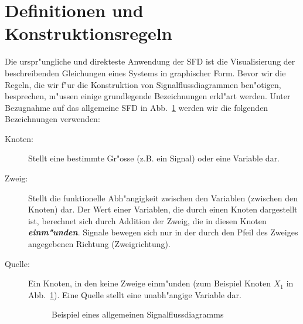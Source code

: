 \section{Definitionen und Konstruktionsregeln} 
Die urspr"ungliche und direkteste Anwendung der SFD ist die
Visualisierung der beschreibenden Gleichungen eines Systems in
graphischer Form. Bevor wir die Regeln, die wir f"ur die Konstruktion
von Signalflussdiagrammen ben"otigen, besprechen, m"ussen einige
grundlegende Bezeichnungen erkl"art werden. Unter Bezugnahme auf das
allgemeine SFD in Abb.~\ref{SFD1} werden wir die
folgenden Bezeichnungen verwenden: %
\begin{description}
\item[Knoten:] Stellt eine bestimmte Gr"osse (z.B. ein Signal) oder eine Variable dar.
\item[Zweig:] Stellt die funktionelle Abh"angigkeit
  zwischen den Variablen (zwischen den Knoten) dar. Der Wert einer
  Variablen, die durch einen Knoten dargestellt ist, berechnet sich
  durch Addition der Zweig, die in diesen Knoten {\it\textbf{einm"unden}}.
  Signale bewegen sich nur in der durch den Pfeil des Zweiges
  angegebenen Richtung (Zweigrichtung).
\item[Quelle:] Ein Knoten, in den keine Zweige
  einm"unden (zum Beispiel Knoten $X_1$ in Abb.~\ref{SFD1}). Eine Quelle stellt eine
  unabh"angige Variable dar.
\begin{figure}[htb!]
\begin{center} 
  \caption{Beispiel eines allgemeinen
Signalflussdiagramms}\label{SFD1}
\end{center}
\vspace*{-7mm}
\end{figure}


\end{description}
